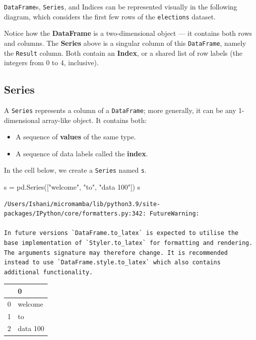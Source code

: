 \documentclass[
  letterpaper,
  DIV=11,
  numbers=noendperiod]{scrreprt}
\newenvironment{Shaded}{\begin{snugshade}}{\end{snugshade}}
\newcommand{\NormalTok}[1]{\textcolor[rgb]{0.00,0.23,0.31}{#1}}
\newcommand{\OperatorTok}[1]{\textcolor[rgb]{0.37,0.37,0.37}{#1}}
\newcommand{\StringTok}[1]{\textcolor[rgb]{0.13,0.47,0.30}{#1}}
\providecommand{\tightlist}{%
  \setlength{\itemsep}{0pt}\setlength{\parskip}{0pt}}\usepackage{longtable,booktabs,array}
\begin{document}
\texttt{DataFrame}s, \texttt{Series}, and Indices can be represented
visually in the following diagram, which considers the first few rows of
the \texttt{elections} dataset.

Notice how the \textbf{DataFrame} is a two-dimensional object --- it
contains both rows and columns. The \textbf{Series} above is a singular
column of this \texttt{DataFrame}, namely the \texttt{Result} column.
Both contain an \textbf{Index}, or a shared list of row labels (the
integers from 0 to 4, inclusive).

\hypertarget{series}{%
\subsection{Series}\label{series}}

A \texttt{Series} represents a column of a \texttt{DataFrame}; more
generally, it can be any 1-dimensional array-like object. It contains
both:

\begin{itemize}
\tightlist
\item
  A sequence of \textbf{values} of the same type.
\item
  A sequence of data labels called the \textbf{index}.
\end{itemize}

In the cell below, we create a \texttt{Series} named \texttt{s}.

\begin{Shaded}
\begin{Highlighting}[]
\NormalTok{s }\OperatorTok{=}\NormalTok{ pd.Series([}\StringTok{"welcome"}\NormalTok{, }\StringTok{"to"}\NormalTok{, }\StringTok{"data 100"}\NormalTok{])}
\NormalTok{s}
\end{Highlighting}
\end{Shaded}

\begin{verbatim}
/Users/Ishani/micromamba/lib/python3.9/site-packages/IPython/core/formatters.py:342: FutureWarning:

In future versions `DataFrame.to_latex` is expected to utilise the base implementation of `Styler.to_latex` for formatting and rendering. The arguments signature may therefore change. It is recommended instead to use `DataFrame.style.to_latex` which also contains additional functionality.
\end{verbatim}

\begin{tabular}{ll}
\toprule
{} &         0 \\
\midrule
0 &   welcome \\
1 &        to \\
2 &  data 100 \\
\bottomrule
\end{tabular}
\end{document}
